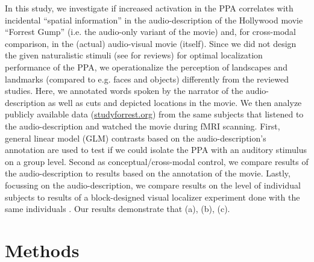\documentclass[english]{article}
\begin{document}
In this study, we investigate if increased activation in the PPA correlates with
incidental ``spatial information'' in the audio-description of the Hollywood
movie ``Forrest Gump'' (i.e. the audio-only variant of the movie) and, for
cross-modal comparison, in the (actual) audio-visual movie (itself).
Since we did not design the given naturalistic stimuli (see
\citep{hamilton2018revolution, hasson2008neurocinematics,
sonkusare2019naturalistic} for reviews) for optimal localization performance of
the PPA, we operationalize the perception of landscapes and landmarks (compared
to e.g. faces and objects) differently from the reviewed studies.
Here, we annotated words spoken by the narrator of the audio-description as well
as cuts and depicted locations in the movie.
We then analyze publicly available data
(\href{http://www.studyforrest.org}{studyforrest.org}) from the same subjects
that listened to the audio-description and watched the movie during fMRI
scanning.
First, general linear model (GLM) contrasts based on the audio-description's
annotation are used to test if we could isolate the PPA with an auditory
stimulus on a group level.
Second as conceptual/cross-modal control, we compare results of the
audio-description to results based on the annotation of the movie.
Lastly, focussing on the audio-description, we compare results on the level of
individual subjects to results of a block-designed visual localizer experiment
done with the same individuals \citep{sengupta2016extension}.
Our results demonstrate that (a), (b), (c).



\section{Methods}


\end{document}
